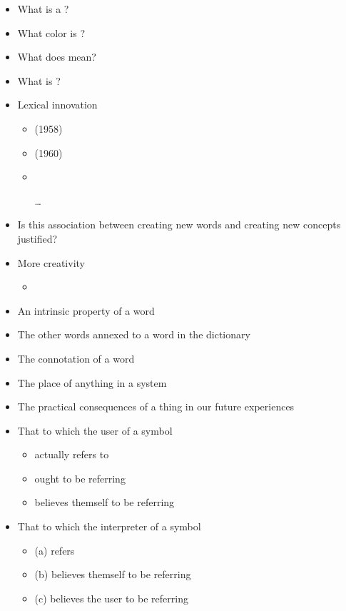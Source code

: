 \documentclass[a4paper,landscape,headrule,footrule,xetex,25pt]{foils}
\begin{document}

\begin{itemize}
\item What is a ?
\item What color is ?
\item What does  mean?
\item What is  ?
\end{itemize}



\begin{itemize}
\item Lexical innovation
  \begin{itemize}
  \item {} (1958)
  \item {} (1960)
  \item {}
  \item[\ldots]
  \end{itemize}
\item   Is this association between creating new words and creating new concepts justified?
\item More creativity
  \begin{itemize}
  \item {}
  \end{itemize}
\end{itemize}


\begin{itemize}
\item An intrinsic property of a word
\item The other words annexed to a word in the dictionary
\item The connotation of a word
\item The place of anything in a system
\item The practical consequences of a thing in our future experiences
\newpage
\item That to which the user of a symbol
  \begin{itemize}
  \item actually refers to
  \item ought to be referring
  \item believes themself to be referring
  \end{itemize}
\item That to which the interpreter of a symbol
  \begin{itemize}
  \item (a) refers
  \item (b) believes themself to be referring
  \item (c) believes the user to be referring
  \end{itemize}
\end{itemize}
\end{document}
